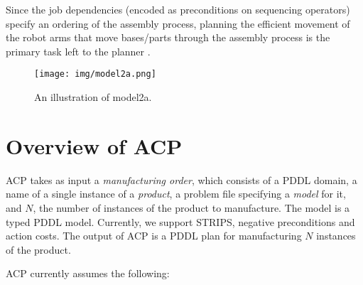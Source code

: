 Since the job dependencies (encoded as preconditions on sequencing operators) specify an ordering of the assembly
process, planning the efficient movement of the robot arms that move
bases/parts through the assembly process is the primary task left to the planner \cite{Ochi2013}.

\begin{figure}
 \centering
 \texttt{[image: img/model2a.png]}
\caption{An illustration of model2a.}
\label{model2a}
\end{figure}



\section{Overview of ACP}

ACP takes as input a {\em manufacturing order}, which consists of
a PDDL domain, a name of a single
instance of a {\em product}, a problem file specifying a {\em model} for it,
 and $N$, the number of instances of
the product to manufacture. The model is a typed PDDL
model. Currently, we support STRIPS, negative preconditions and action
costs.  The output of ACP is a PDDL plan for manufacturing $N$
instances of the product.

ACP currently assumes the following:


